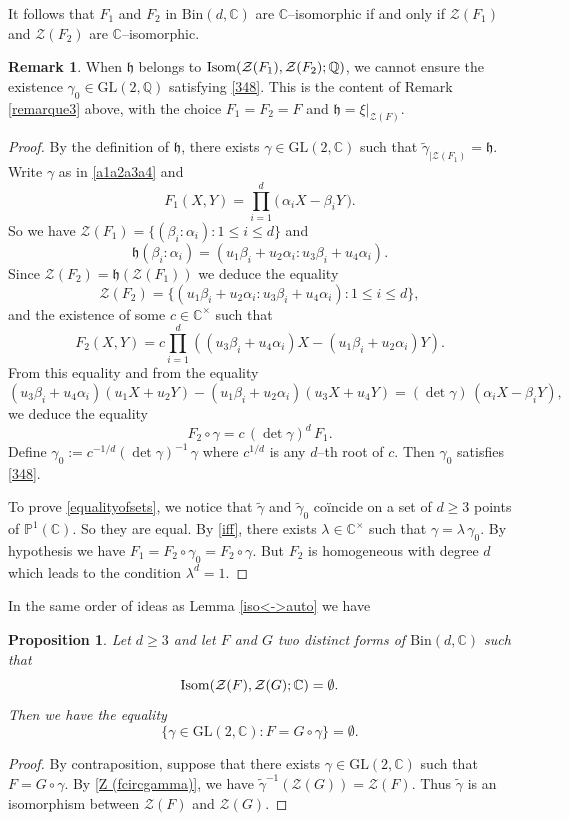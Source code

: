 \documentclass[10pt]{article}
\newtheorem{proposition}[theorem]{Proposition}
\theoremstyle{definition}
\newtheorem{remark}[theorem]{Remark}
\numberwithin{equation}{section}
\newcommand {\Q}{{\mathbb{Q}}}
\newcommand {\C}{{\mathbb{C}}}
\newcommand {\PP}{{\mathbb{P}}}
\newcommand{\Bin}{\mathrm {Bin}}
\newcommand{\GL}{\mathrm {GL}}
\begin{document}
It follows that $F_1$ and $F_2$ in $\Bin  (d, \C)$ are $\C$--isomorphic if and only if $\mathcal Z (F_1)$ and $\mathcal Z (F_2)$ are $\C$--isomorphic. 

\begin{remark}\label{remarque4}
 When $\mathfrak h$ belongs to ${\rm Isom}(\mathcal Z (F_1), \mathcal Z (F_2); \Q)$, we cannot ensure the existence $\gamma_0\in {\GL}(2, \Q)$ satisfying \eqref{348}. This is the content of Remark \ref{remarque3} above, with the choice $F_1=F_2=F$ and $\mathfrak h = \xi|_{\mathcal Z (F)}$. 
\end{remark}

\begin{proof} By the definition of $\mathfrak h$, there exists $\gamma \in {\GL}(2, \C)$ such that $\tilde \gamma_{\vert \mathcal Z (F_1)} = \mathfrak h$. Write $\gamma $ as in \eqref{a1a2a3a4} 
and 
\[
F_1 (X,Y) =\prod_{i=1}^d \bigl(\, \alpha_i X - \beta_i Y\, \bigr).
\]
So we have $\mathcal Z (F_1)= \bigl\{ (\beta_i: \alpha_i) : 1\leqslant i \leqslant d\bigr\}$ and 
\[
\mathfrak h (\beta_i: \alpha_i)= (u_1\beta_i + u_2 \alpha_i:
u_3 \beta_i + u_4 \alpha_i).
\]
Since $ \mathcal Z (F_2) = \mathfrak h (\mathcal Z (F_1)) $ we deduce the equality
\[
\mathcal Z (F_2) = \bigl\{ (u_1\beta_i + u_2 \alpha_i:
u_3 \beta_i + u_4 \alpha_i) : 1\leqslant i \leqslant d \bigr\},
\]
and the existence of some 
 $c\in \C^\times$ such that
\[
F_2(X,Y) = c \prod_{i=1}^d \left( (u_3 \beta_i + u_4 \alpha_i)X- (u_1\beta_i + u_2 \alpha_i)Y
\right).
\]
From this equality and from the equality 
\[
 ( u_3 \beta_i + u_4 \alpha_i) (u_1X+u_2Y) -(u_1\beta_i + u_2 \alpha_i)(u_3X +u_4Y) = (\det \gamma) \, (\alpha_i X-\beta_iY),
\]
we deduce the equality
\[
F_2 \circ \gamma = c\,(\det \gamma)^d \,F_1.
\]
Define $\gamma_0 := c^{-1/d} (\det \gamma)^{-1}\, \gamma$ where $c^{1/d}$ is any $d$--th root of $c$. 
Then
$\gamma_0$ satisfies \eqref{348}.

To prove \eqref{equalityofsets}, we notice that $\tilde \gamma$ and $\tilde \gamma_0$ co\" incide on a set of $d\geqslant 3$ points of $\PP^1 (\C)$. So they are equal. By \eqref{iff}, there exists 
$\lambda \in \C^\times$ such that $\gamma =\lambda \, \gamma_0$. By hypothesis we have $F_1= F_2 \circ \gamma_0 =F_2 \circ \gamma$.
But $F_2$ is homogeneous with degree $d$ which leads to the condition $\lambda^d =1$. 
\end{proof}

In the same order of ideas as Lemma \ref{iso<->auto} we have 
\begin{proposition}\label{Prop3.9}
Let $d \geqslant 3$ and let $F$ and $G$ two distinct forms of $\Bin  (d, \C)$ such that
\[
{\rm Isom} (\mathcal Z (F), \mathcal Z (G); \C) = \emptyset.
\]
Then we have the equality
 \[
 \{ \gamma \in {\GL}(2, \C) : F= G\circ \gamma \}
 =\emptyset.
 \]
\end{proposition}
\begin{proof} By contraposition, suppose that there exists $\gamma \in {\GL}(2, \C)$ such that $F=G\circ \gamma$.
By \eqref{Z (fcircgamma)}, we have 
$\tilde \gamma^{-1} (\mathcal Z (G)) = \mathcal Z (F)$. Thus $\tilde \gamma$ is an isomorphism between $\mathcal Z (F)$
and $\mathcal Z(G)$.
\end{proof}
 
\end{document}
